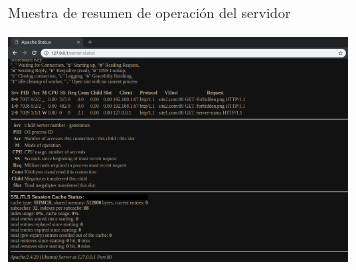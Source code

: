 \begin{enumerate}
\begin{figure}[htbp]
			\caption[Muestra de resumen de operación del servidor]{Muestra de resumen de operación del servidor}
			\label{fig:18}
		\end{figure}
		\begin{figure}[htbp]
			\centering
				\includegraphics[width=9cm]{./img/lista/18_1.png}
				\label{fig:18.1}
			\end{figure}
	\end{enumerate}

